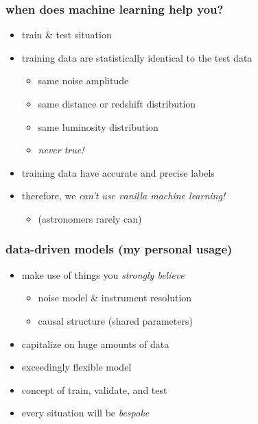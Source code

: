 \documentclass[pdftex]{beamer}
\begin{document}
\begin{frame}
  \frametitle{when does machine learning help you?}
  \begin{itemize}
  \item train \& test situation
  \item training data are statistically identical to the test data
    \begin{itemize}
    \item same noise amplitude
    \item same distance or redshift distribution
    \item same luminosity distribution
    \item \emph{never true!}
    \end{itemize}
  \item training data have accurate and precise labels
  \item therefore, we \emph{can't use vanilla machine learning!}
    \begin{itemize}
    \item (astronomers rarely can)
    \end{itemize}
  \end{itemize}
\end{frame}

\begin{frame}
  \frametitle{data-driven models (my personal usage)}
  \begin{itemize}
  \item make use of things you \emph{strongly believe}
    \begin{itemize}
    \item noise model \& instrument resolution
    \item causal structure (shared parameters)
    \end{itemize}
  \item capitalize on huge amounts of data
  \item exceedingly flexible model
  \item concept of train, validate, and test
  \item every situation will be \emph{bespoke}
  \end{itemize}
\end{frame}
\end{document}
